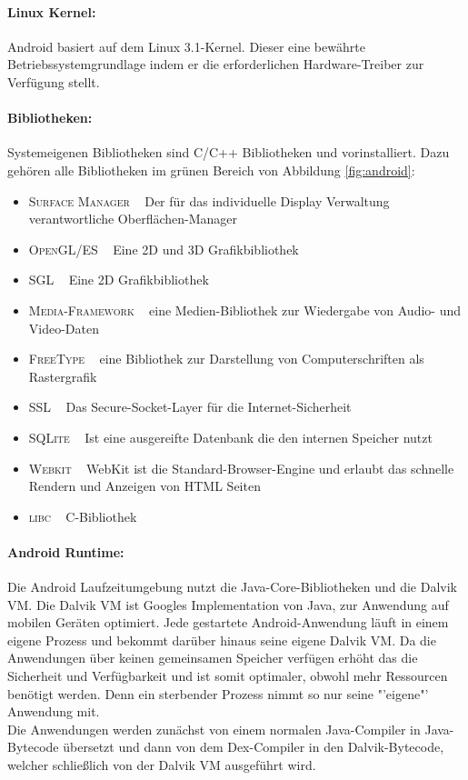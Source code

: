 \paragraph{Linux Kernel: }
Android basiert auf dem Linux 3.1-Kernel. Dieser eine bewährte Betriebssystemgrundlage indem er die erforderlichen Hardware-Treiber zur Verfügung stellt.
\paragraph{Bibliotheken: }
Systemeigenen Bibliotheken sind C/C++ Bibliotheken und vorinstalliert. Dazu gehören alle Bibliotheken im grünen Bereich von Abbildung \ref{fig:android}:
\begin{itemize}[leftmargin=0.7cm]
\renewcommand\labelitemi{--}
	\item \textsc{Surface Manager} ~ Der für das individuelle Display Verwaltung verantwortliche Oberflächen-Manager
	\item \textsc{OpenGL/ES} ~ Eine 2D und 3D Grafikbibliothek
	\item \textsc{SGL} ~ Eine 2D Grafikbibliothek
 	\item \textsc{Media-Framework} ~ eine Medien-Bibliothek zur Wiedergabe von Audio- und Video-Daten 	
 	\item \textsc{FreeType} ~ eine Bibliothek zur Darstellung von Computerschriften als Rastergrafik
 	\item \textsc{SSL} ~ Das Secure-Socket-Layer für die Internet-Sicherheit
	\item \textsc{SQLite} ~ Ist eine ausgereifte Datenbank die den internen Speicher nutzt 
	\item \textsc{Webkit} ~ WebKit ist die Standard-Browser-Engine und erlaubt das schnelle Rendern und Anzeigen von HTML Seiten
	\item \textsc{libc} ~ C-Bibliothek
\end{itemize}
\paragraph{Android Runtime: }
Die Android Laufzeitumgebung nutzt die Java-Core-Bibliotheken und die Dalvik \gls{VM}. 
Die Dalvik \gls{VM} ist Googles Implementation von Java, zur Anwendung auf mobilen Geräten optimiert. Jede gestartete Android-Anwendung läuft in einem eigene Prozess und bekommt darüber hinaus seine eigene Dalvik \gls{VM}. Da die Anwendungen über keinen gemeinsamen Speicher verfügen erhöht das die Sicherheit und Verfügbarkeit und ist somit optimaler, obwohl mehr Ressourcen benötigt werden. Denn ein sterbender Prozess nimmt so nur seine "'eigene"' Anwendung mit. \\ 
Die Anwendungen werden zunächst von einem normalen Java-Compiler in Java-Bytecode übersetzt und dann von dem Dex-Compiler in den Dalvik-Bytecode, welcher schließlich von der Dalvik \gls{VM} ausgeführt wird.
